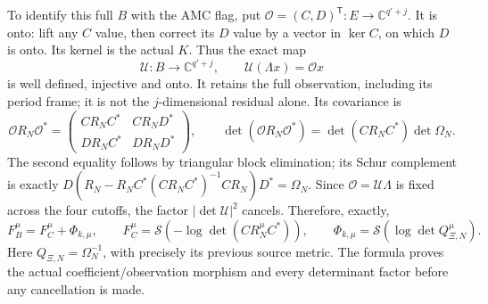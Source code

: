 To identify this full $B$ with the AMC flag, put
$\mathscr O=(C,D)^{\mathsf T}:E\to\mathbb C^{q'+j}$.
It is onto: lift any $C$ value, then correct its $D$ value by a vector
in $\ker C$, on which $D$ is onto. Its kernel is the actual $K$.
Thus the exact map
\[
 \mathcal U:B\longrightarrow\mathbb C^{q'+j},\qquad
 \mathcal U(\Lambda x)=\mathscr Ox
 \tag{SCA23}
\]
is well defined, injective and onto. It retains the full observation,
including its period frame; it is not the $j$-dimensional residual alone.
Its covariance is
\[
 \mathscr OR_N\mathscr O^*
 =\begin{pmatrix}CR_NC^*&CR_ND^*\\DR_NC^*&DR_ND^*\end{pmatrix},
 \qquad
 \det(\mathscr OR_N\mathscr O^*)
       =\det(CR_NC^*)\det\Omega_N.
 \tag{SCA24}
\]
The second equality follows by triangular block elimination; its Schur
complement is exactly $D(R_N-R_NC^*(CR_NC^*)^{-1}CR_N)D^*=\Omega_N$.
Since $\mathscr O=\mathcal U\Lambda$ is fixed across the four cutoffs,
the factor $|\det\mathcal U|^2$ cancels. Therefore, exactly,
\[
 F_B^{\mu}=F_C^{\mu}+\Phi_{k,\mu},\qquad
 F_C^{\mu}=\mathscr S(-\log\det(CR_N^{\mu}C^*)),\qquad
 \Phi_{k,\mu}=\mathscr S(\log\det Q_{\Xi,N}^{\mu}).
 \tag{SCA25}
\]
Here $Q_{\Xi,N}=\Omega_N^{-1}$, with precisely its previous source metric.
The formula proves the actual coefficient/observation morphism and every
determinant factor before any cancellation is made.

